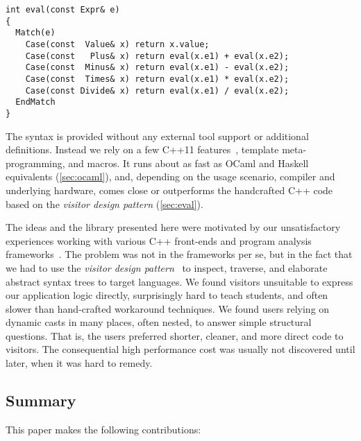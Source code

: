 
\begin{lstlisting}[columns=flexible]
int eval(const Expr& e)
{
  Match(e)
    Case(const  Value& x) return x.value;
    Case(const   Plus& x) return eval(x.e1) + eval(x.e2);
    Case(const  Minus& x) return eval(x.e1) - eval(x.e2);
    Case(const  Times& x) return eval(x.e1) * eval(x.e2);
    Case(const Divide& x) return eval(x.e1) / eval(x.e2);
  EndMatch
}
\end{lstlisting}

\noindent
The syntax is provided without any external tool support or additional definitions. Instead we rely on a 
few C++11 features~\cite{C++11}, template meta-programming, and macros. It runs 
about as fast as OCaml and Haskell equivalents (\textsection\ref{sec:ocaml}), and, depending 
on the usage scenario, compiler and underlying hardware, comes close or 
outperforms the handcrafted C++ code based on the \emph{visitor design pattern} 
(\textsection\ref{sec:eval}).

The ideas and the library presented here were motivated by our unsatisfactory experiences 
working with various C++ front-ends and program analysis 
frameworks~\cite{Pivot09,Phoenix,Clang}.
The problem was not in the frameworks per se, but in the fact that we had to use
the \emph{visitor design pattern}~\cite{DesignPatterns1993} to inspect, traverse, and 
elaborate abstract syntax trees to target languages. We found visitors 
unsuitable to express our application logic directly, surprisingly hard to teach 
students, and often slower than hand-crafted workaround techniques.
We found users relying on dynamic casts in many places, often nested, to answer simple structural 
questions. That is, the users preferred shorter, cleaner, and more direct code 
to visitors. The consequential high performance cost was usually not discovered
until later, when it was hard to remedy.

\subsection{Summary}

This paper makes the following contributions:

